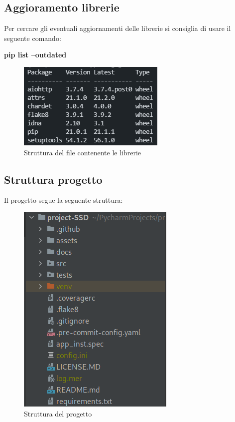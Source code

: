 \subsection{Aggioramento librerie}
Per cercare gli eventuali aggiornamenti delle librerie si consiglia di usare il seguente comando:
\newline{}\centerline{\textbf{pip list --outdated}}\newline{}
\begin{figure}[H]
    \centering
    \includegraphics[scale = 0.7]{components/img/requirements_updates.png}
    \caption{Struttura del file contenente le librerie}
    \label{fig:Lista di aggiornamenti disponibili per le librerie}
\end{figure}

\subsection{Struttura progetto}
Il progetto segue la seguente struttura:
\begin{figure}[H]
    \centering
    \includegraphics[scale = 0.5]{components/img/struttura-cartella-ssd.png}
    \caption{Struttura del progetto}
    \label{fig:Struttura del progetto}
\end{figure}
